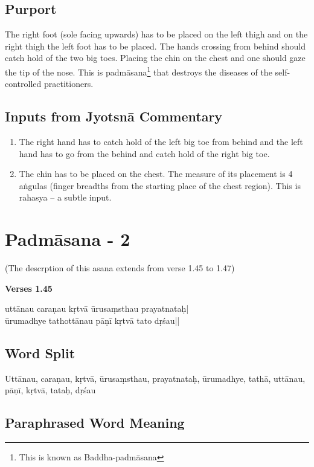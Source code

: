 \subsection*{Purport}


The right foot (sole facing upwards) has to be placed on the left thigh and on the right thigh the left foot has to be placed. The hands crossing from behind should catch hold of the two big toes. Placing the chin on the chest and one should gaze the tip of the nose. This is padmāsana\footnote{This is known as Baddha-padmāsana} that destroys the diseases of the self-controlled practitioners.

\subsection*{Inputs from Jyotsnā Commentary}


\begin{enumerate}
\item The right hand has to catch hold of the left big toe from behind and the left hand has to go from the behind and catch hold of the right big toe. 
\item The chin has to be placed on the chest. The measure of its placement is 4 aṅgulas (finger breadths from the starting place of the chest region). This is rahasya – a subtle input.  
\end{enumerate}

\section*{Padmāsana - 2}

\centerline{(The descrption of this asana extends from verse 1.45 to 1.47)}

\noindent \textbf{Verses 1.45}

\begin{shloka}
uttānau caraṇau kṛtvā ūrusaṃsthau prayatnataḥ|\\
ūrumadhye tathottānau pāṇī kṛtvā tato dṛśau||
\end{shloka}

\subsection*{Word Split}


Uttānau, caraṇau, kṛtvā, ūrusaṃsthau, prayatnataḥ, ūrumadhye, tathā, uttānau, pāṇī, kṛtvā, tataḥ, dṛśau

\subsection*{Paraphrased Word Meaning}


